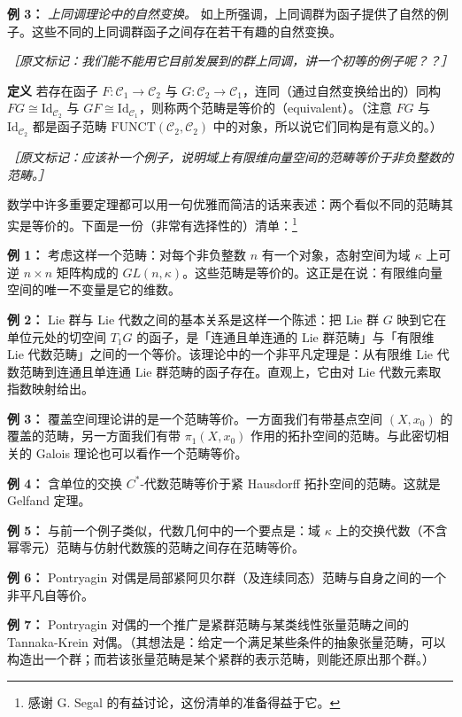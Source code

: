 \textbf{例 3：} \textit{上同调理论中的自然变换。} 如上所强调，上同调群为函子提供了自然的例子。这些不同的上同调群函子之间存在若干有趣的自然变换。

{\small\itshape ［原文标记：我们能不能用它目前发展到的群上同调，讲一个初等的例子呢？？］}

\textbf{定义} 若存在函子 $F:\mathcal{C}_1\to\mathcal{C}_2$ 与 $G:\mathcal{C}_2\to\mathcal{C}_1$，连同（通过自然变换给出的）同构 $FG\cong\mathrm{Id}_{\mathcal{C}_2}$ 与 $GF\cong\mathrm{Id}_{\mathcal{C}_1}$，则称两个范畴是等价的（equivalent）。（注意 $FG$ 与 $\mathrm{Id}_{\mathcal{C}_2}$ 都是函子范畴 $\mathrm{FUNCT}(\mathcal{C}_2,\mathcal{C}_2)$ 中的对象，所以说它们同构是有意义的。）

{\small\itshape ［原文标记：应该补一个例子，说明域上有限维向量空间的范畴等价于非负整数的范畴。］}

数学中许多重要定理都可以用一句优雅而简洁的话来表述：两个看似不同的范畴其实是等价的。下面是一份（非常有选择性的）清单：\footnote{感谢 G. Segal 的有益讨论，这份清单的准备得益于它。}

\textbf{例 1：} 考虑这样一个范畴：对每个非负整数 $n$ 有一个对象，态射空间为域 $\kappa$ 上可逆 $n\times n$ 矩阵构成的 $GL(n,\kappa)$。这些范畴是等价的。这正是在说：有限维向量空间的唯一不变量是它的维数。

\textbf{例 2：} Lie 群与 Lie 代数之间的基本关系是这样一个陈述：把 Lie 群 $G$ 映到它在单位元处的切空间 $T_1G$ 的函子，是「连通且单连通的 Lie 群范畴」与「有限维 Lie 代数范畴」之间的一个等价。该理论中的一个非平凡定理是：从有限维 Lie 代数范畴到连通且单连通 Lie 群范畴的函子存在。直观上，它由对 Lie 代数元素取指数映射给出。

\textbf{例 3：} 覆盖空间理论讲的是一个范畴等价。一方面我们有带基点空间 $(X,x_0)$ 的覆盖的范畴，另一方面我们有带 $\pi_1(X,x_0)$ 作用的拓扑空间的范畴。与此密切相关的 Galois 理论也可以看作一个范畴等价。

\textbf{例 4：} 含单位的交换 $C^*$-代数范畴等价于紧 Hausdorff 拓扑空间的范畴。这就是 Gelfand 定理。

\textbf{例 5：} 与前一个例子类似，代数几何中的一个要点是：域 $\kappa$ 上的交换代数（不含幂零元）范畴与仿射代数簇的范畴之间存在范畴等价。

\textbf{例 6：} Pontryagin 对偶是局部紧阿贝尔群（及连续同态）范畴与自身之间的一个非平凡自等价。

\textbf{例 7：} Pontryagin 对偶的一个推广是紧群范畴与某类线性张量范畴之间的 Tannaka-Krein 对偶。（其想法是：给定一个满足某些条件的抽象张量范畴，可以构造出一个群；而若该张量范畴是某个紧群的表示范畴，则能还原出那个群。）

